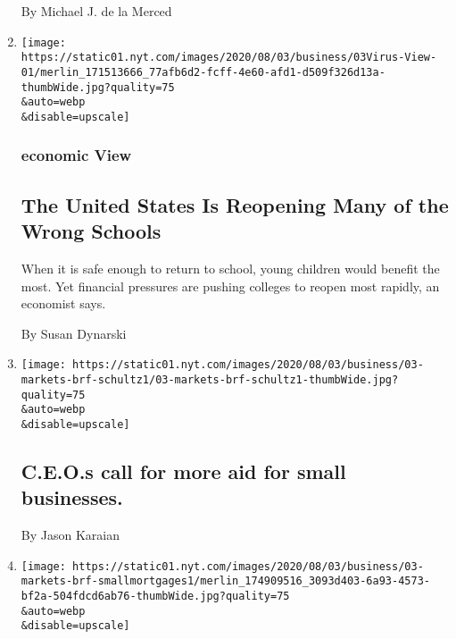 \begin{enumerate}
  By Michael J. de la Merced
\item
  \href{/2020/08/03/business/how-schools-reopen.html}{}

  \texttt{[image: https://static01.nyt.com/images/2020/08/03/business/03Virus-View-01/merlin\_171513666\_77afb6d2-fcff-4e60-afd1-d509f326d13a-thumbWide.jpg?quality=75\\\&auto=webp\\\&disable=upscale]}

  \hypertarget{economic-view}{%
  \subsubsection{economic View}\label{economic-view}}

  \hypertarget{the-united-states-is-reopening-many-of-the-wrong-schools}{%
  \subsection{The United States Is Reopening Many of the Wrong
  Schools}\label{the-united-states-is-reopening-many-of-the-wrong-schools}}

  When it is safe enough to return to school, young children would
  benefit the most. Yet financial pressures are pushing colleges to
  reopen most rapidly, an economist says.

  By Susan Dynarski
\item
  \href{/2020/08/03/business/ceos-call-for-more-aid-for-small-businesses.html}{}

  \texttt{[image: https://static01.nyt.com/images/2020/08/03/business/03-markets-brf-schultz1/03-markets-brf-schultz1-thumbWide.jpg?quality=75\\\&auto=webp\\\&disable=upscale]}

  \hypertarget{ceos-call-for-more-aid-for-small-businesses}{%
  \subsection{C.E.O.s call for more aid for small
  businesses.}\label{ceos-call-for-more-aid-for-small-businesses}}

  By Jason Karaian
\item
  \href{/2020/08/03/business/a-project-in-kentucky-aims-to-show-how-home-lending-can-build-wealth.html}{}

  \texttt{[image: https://static01.nyt.com/images/2020/08/03/business/03-markets-brf-smallmortgages1/merlin\_174909516\_3093d403-6a93-4573-bf2a-504fdcd6ab76-thumbWide.jpg?quality=75\\\&auto=webp\\\&disable=upscale]}

  \hypertarget{a-project-in-kentucky-aims-to-show-how-home-lending-can-build-wealth}{%
}
\end{enumerate}
